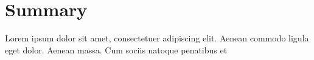 \section{Summary}\label{ch13:summary}

Lorem ipsum dolor sit amet, consectetuer adipiscing elit. Aenean commodo ligula eget dolor. Aenean massa. Cum sociis natoque penatibus et
